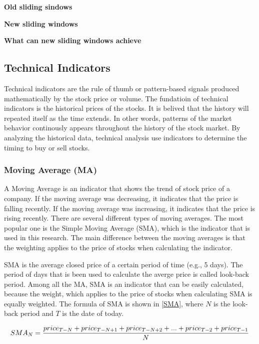 \documentclass[../main.tex]{subfiles}
\begin{document}
\textbf{Old sliding sindows}

\textbf{New sliding windows}

\textbf{What can new sliding windows achieve}

\subsection{Technical Indicators}

Technical indicators are the rule of thumb or pattern-based signals produced mathematically by the stock price or volume. The fundatioin of technical indicators is the historical prices of the stocks. It is belived that the history will repeated itself as the time extends. In other words, patterns of the market behavior continously appears throughout the history of the stock market. By analyzing the historical data, technical analysis use indicators to determine the timing to buy or sell stocks.

\subsubsection{Moving Average (MA)}

A Moving Average is an indicator that shows the trend of stock price of a company. If the moving average was decreasing, it indicates that the price is falling recently. If the moving average was increasing, it indicates that the price is rising recently. There are several different types of moving averages. The most popular one is the Simple Moving Average (SMA), which is the indicator that is used in this research. The main difference between the moving averages is that the weighting applies to the price of stocks when calculating the indicator.

\bigbreak

SMA is the average closed price of a certain period of time (e.g., 5 days). The period of days that is been used to calculate the averge price is called look-back period. Among all the MA, SMA is an indicator that can be easily calculated, because the weight, which applies to the price of stocks when calculating SMA is equally weighted. The formula of SMA is shown in \ref{SMA}, where $N$ is the look-back period and $T$ is the date of today.

\begin{equation}
    \label{SMA}
    \scalebox{1}
    {$SMA_{N} = \dfrac{price_{T-N}+price_{T-N+1}+price_{T-N+2}+...+price_{T-2}+price_{T-1}}{N}$}
\end{equation}
\end{document}
